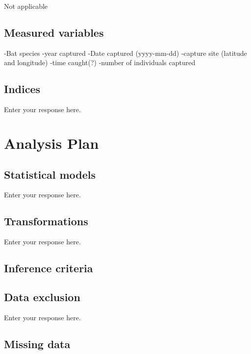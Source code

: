 \documentclass[]{article}
\begin{document}
Not applicable

\hypertarget{measured-variables}{%
\subsection{Measured variables}\label{measured-variables}}

-Bat species -year captured -Date captured (yyyy-mm-dd) -capture site
(latitude and longitude) -time caught(?) -number of individuals captured

\hypertarget{indices}{%
\subsection{Indices}\label{indices}}

Enter your response here.

\hypertarget{analysis-plan}{%
\section{Analysis Plan}\label{analysis-plan}}

\hypertarget{statistical-models}{%
\subsection{Statistical models}\label{statistical-models}}

Enter your response here.

\hypertarget{transformations}{%
\subsection{Transformations}\label{transformations}}

Enter your response here.

\hypertarget{inference-criteria}{%
\subsection{Inference criteria}\label{inference-criteria}}

\hypertarget{data-exclusion}{%
\subsection{Data exclusion}\label{data-exclusion}}

Enter your response here.

\hypertarget{missing-data}{%
\subsection{Missing data}\label{missing-data}}
\end{document}
